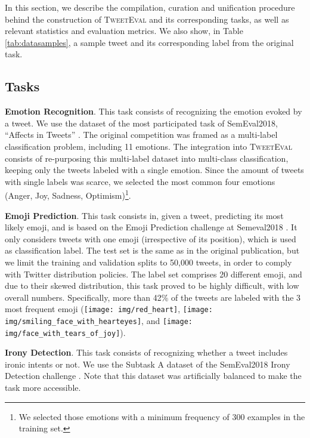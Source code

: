 \documentclass[11pt,a4paper]{article}
\begin{document}
In this section, we describe the compilation, curation and unification procedure behind the construction of \textsc{TweetEval} and its corresponding tasks, as well as relevant statistics and evaluation metrics. We also show, in Table \ref{tab:datasamples}, a sample tweet and its corresponding label from the original task.


\subsection{Tasks}







\textbf{Emotion Recognition}.
This task consists of recognizing the emotion evoked by a tweet. We use the dataset of the most participated task of SemEval2018, ``Affects in Tweets'' \cite{mohammad2018semeval}. The original competition was framed as a multi-label classification problem, including 11 emotions. The integration into \textsc{TweetEval} consists of re-purposing this multi-label dataset into multi-class classification, keeping only the tweets labeled with a single emotion. Since the amount of tweets with single labels was scarce, we selected the most common four emotions
(Anger, Joy, Sadness, Optimism)\footnote{We selected those emotions with a minimum frequency of 300 examples in the training set.}. 

\textbf{Emoji Prediction}.
This task consists in, given a tweet, predicting its most likely emoji, and is based on the Emoji Prediction challenge at Semeval2018 \cite{barbieri2018semeval}. It only considers tweets with one emoji (irrespective of its position), which is used as classification label. The test set is the same as in the original publication, but we limit the training and validation splits to 50,000 tweets, in order to comply with Twitter distribution policies. The label set comprises 20 different emoji, and due to their skewed distribution, this task proved to be highly difficult, with low overall numbers. Specifically, more than 42\% of the tweets are labeled with the 3 most frequent emoji
(\texttt{[image: img/red\_heart]}, \texttt{[image: img/smiling\_face\_with\_hearteyes]}, and \texttt{[image: img/face\_with\_tears\_of\_joy]}). 

\textbf{Irony Detection}. This task consists of recognizing whether a tweet includes ironic intents or not. We use the Subtask A dataset of the SemEval2018 Irony Detection challenge \cite{van2018semeval}. Note that this dataset was artificially balanced to make the task more accessible. 
\end{document}
